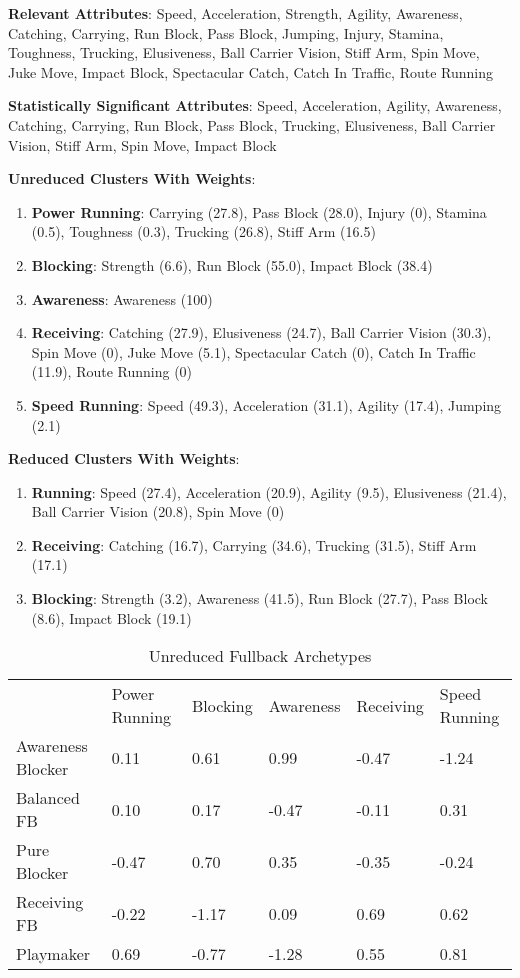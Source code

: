 \documentclass[11pt]{article}
\begin{document}
\textbf{Relevant Attributes}: Speed, Acceleration, Strength, Agility, Awareness, Catching, Carrying, Run Block, Pass Block, Jumping, Injury, Stamina, Toughness, Trucking, Elusiveness, Ball Carrier Vision, Stiff Arm, Spin Move, Juke Move, Impact Block, Spectacular Catch, Catch In Traffic, Route Running

\textbf{Statistically Significant Attributes}: Speed, Acceleration, Agility, Awareness, Catching, Carrying, Run Block, Pass Block, Trucking, Elusiveness, Ball Carrier Vision, Stiff Arm, Spin Move, Impact Block

\textbf{Unreduced Clusters With Weights}:

\begin{enumerate}
\item{\textbf{Power Running}}: Carrying (27.8), Pass Block (28.0), Injury (0), Stamina (0.5), Toughness (0.3), Trucking (26.8), Stiff Arm (16.5)
\item{\textbf{Blocking}}: Strength (6.6), Run Block (55.0), Impact Block (38.4)
\item{\textbf{Awareness}}: Awareness (100)
\item{\textbf{Receiving}}: Catching (27.9), Elusiveness (24.7), Ball Carrier Vision (30.3), Spin Move (0), Juke Move (5.1), Spectacular Catch (0), Catch In Traffic (11.9), Route Running (0)
\item{\textbf{Speed Running}}: Speed (49.3), Acceleration (31.1), Agility (17.4), Jumping (2.1)
\end{enumerate}

\textbf{Reduced Clusters With Weights}:

\begin{enumerate}
\item{\textbf{Running}}: Speed (27.4), Acceleration (20.9), Agility (9.5), Elusiveness (21.4), Ball Carrier Vision (20.8), Spin Move (0)
\item{\textbf{Receiving}}: Catching (16.7), Carrying (34.6), Trucking (31.5), Stiff Arm (17.1)
\item{\textbf{Blocking}}: Strength (3.2), Awareness (41.5), Run Block (27.7), Pass Block (8.6), Impact Block (19.1)
\end{enumerate}

\begin{table}[]
\centering
\caption{Unreduced Fullback Archetypes}
\label{UnreducedFullback}
\begin{tabular}{llllll}
                  & Power Running & Blocking & Awareness & Receiving & Speed Running \\
Awareness Blocker & 0.11          & 0.61     & 0.99      & -0.47     & -1.24         \\
Balanced FB       & 0.10          & 0.17     & -0.47     & -0.11     & 0.31          \\
Pure Blocker      & -0.47         & 0.70     & 0.35      & -0.35     & -0.24         \\
Receiving FB      & -0.22         & -1.17    & 0.09      & 0.69      & 0.62          \\
Playmaker         & 0.69          & -0.77    & -1.28     & 0.55      & 0.81         
\end{tabular}
\end{table}
\end{document}
